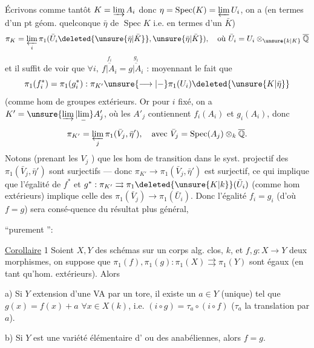 Écrivons comme tantôt $K=\varinjlim A_i$ donc  $\eta=\operatorname{Spec}(K)=\varprojlim U_i$, on a (en termes d'un pt géom. quelconque $\bar\eta$ de $\operatorname{Spec}K$ i.e. en termes d'un $\bar K$)
\[
\pi_K=\varprojlim_i\pi_1(\bar U_i\deleted{\unsure{\bar\eta|\bar K}},\unsure{\bar\eta|\bar K}),\quad\text{où }\bar U_i=U_i\otimes_{\unsure{k|K}}\overline{\mathbb Q}
\]
et il suffit de voir que $\forall i,\ \overset{f_i}{\overline{f|A_i}}=\overset{g_i}{\overline{g|A_i}}$ : moyennant le fait que
\[
\pi_1(f_i^*)=\pi_1(g_i^*):\pi_{K'}\unsure{\longrightarrow|-}\pi_1(U_i)\deleted{\unsure{K|\bar\eta}}
\]
(comme hom de groupes extérieurs. Or pour $i$ fixé, on a $K'=\unsure{\varinjlim|\underset{-}{\lim}} A'_j$, où les $A'_j$ contiennent $f_i(A_i)$ et $g_i(A_i)$, donc
\[
\pi_{K'}=\varprojlim_j\pi_1(\bar V_j,\bar\eta'),\quad\text{avec }\bar V_j=\operatorname{Spec}(A_j)\otimes_k\overline{\mathbb Q}.
\]
Notons (prenant les $V_j$ ) que les hom de transition dans le syst. projectif des $\pi_1(\bar V_j,\bar\eta')$ sont surjectifs --- donc  $\pi_{K'}\longrightarrow\pi_1(\bar V_j,\bar\eta')$ est surjectif, ce qui implique que l'égalité de $f^*$ et $g^*:\pi_{K'}\rightrightarrows\pi_1\deleted{\unsure{K|k}}(\bar U_i)$ (comme hom extérieurs) implique celle des $\pi_1(\bar V_j)\longrightarrow\pi_1(\bar U_i)$.
Donc l'égalité $f_i=g_i$ (d'où $f=g$) sera consé-quence du résultat plus général,

\uline{} ``purement '':

\uline{Corollaire} 1 Soient $X,Y$ des schémas  sur un corps alg. clos, $k$, et $f,g:X\longrightarrow Y$ deux morphismes, on suppose que $\pi_1(f),\pi_1(g):\pi_1(X)\rightrightarrows\pi_1(Y)$ sont égaux (en tant qu'hom. extérieurs). Alors

a) Si $Y$   extension d'une VA par un tore, il existe un $a\in Y$ (unique) tel que $g(x)=f(x)+a$ $\forall x\in X(k)$, i.e. $(i\circ g)=\tau_a\circ(i\circ f)$ ($\tau_a$ la translation par $a$).

b) Si $Y$ est une variété élémentaire d' ou    des  anabéliennes,  alors $f=g$.


